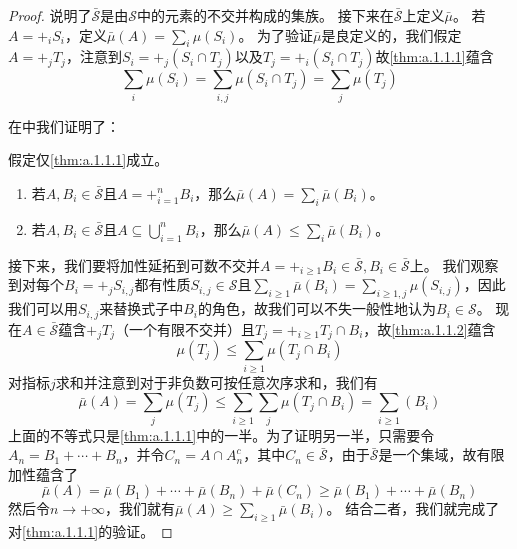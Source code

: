 \documentclass[main.tex]{subfiles}
\begin{document}
\begin{proof}
	说明了\(\bar{\mathcal{S}}\)是由\(\mathcal{S}\)中的元素的不交并构成的集族。
	接下来在\(\bar{\mathcal{S}}\)上定义\(\bar{\mu}\)。
	若\(A = +_i S_i\)，定义\(\bar{\mu}(A) = \sum_i\mu(S_i)\)。
	为了验证\(\bar{\mu}\)是良定义的，我们假定\(A = +_jT_j\)，注意到\(S_i = +_j(S_i \cap T_j)\)以及\(T_j = +_i(S_i\cap T_j)\)故\ref{thm:a.1.1.1}蕴含
	\[\sum_i \mu(S_i) = \sum_{i,j}\mu(S_i\cap T_j) = \sum_j \mu(T_j)\]

	在中我们证明了：
	\begin{lemma} \label{a.1.2}
		假定仅\ref{thm:a.1.1.1}成立。
		\begin{enumerate} [label=(\alph*)]
			\item 若\(A, B_i \in \bar{\mathcal{S}}\)且\(A = +_{i=1}^n B_i\)，那么\(\bar{\mu}(A) = \sum_i\bar{\mu}(B_i)\)。
			\item 若\(A, B_i \in \bar{\mathcal{S}}\)且\(A \subseteq \bigcup_{i=1}^n B_i\)，那么\(\bar{\mu}(A) \leq \sum_i\bar{\mu}(B_i)\)。
		\end{enumerate}
	\end{lemma}
	接下来，我们要将加性延拓到可数不交并\(A = +_{i\geq 1}B_i \in \bar{\mathcal{S}}, B_i \in \bar{\mathcal{S}}\)上。
	我们观察到对每个\(B_i = +_j S_{i,j}\)都有性质\(S_{i,j} \in \mathcal{S}\)且\(\sum_{i\geq 1}\bar{\mu}(B_i) = \sum_{i\geq 1,j}\mu(S_{i,j})\)，因此我们可以用\(S_{i,j}\)来替换式子中\(B_i\)的角色，故我们可以不失一般性地认为\(B_i \in \mathcal{S}\)。
	现在\(A \in \bar{\mathcal{S}}\)蕴含\(+_jT_j\)（一个有限不交并）且\(T_j = +_{i\geq 1} T_j\cap B_i\)，故\ref{thm:a.1.1.2}蕴含
	\[\mu(T_j) \leq \sum_{i \geq 1}\mu(T_j \cap B_i)\]
	对指标\(j\)求和并注意到对于非负数可按任意次序求和，我们有
	\[\bar{\mu}(A) = \sum_j\mu(T_j) \leq \sum_{i\geq 1}\sum_j \mu(T_j\cap B_i) = \sum_{i \geq 1}(B_i)\]
	上面的不等式只是\ref{thm:a.1.1.1}中的一半。为了证明另一半，只需要令\(A_n = B_1+\cdots+B_n\)，并令\(C_n = A\cap A_n^c\)，其中\(C_n \in \bar{\mathcal{S}}\)，由于\(\bar{\mathcal{S}}\)是一个集域，故有限加性蕴含了
	\[\bar{\mu}(A) = \bar{\mu}(B_1) + \cdots +\bar{\mu}(B_n) + \bar{\mu}(C_n) \geq \bar{\mu}(B_1) + \cdots + \bar{\mu}(B_n)\]
	然后令\(n \rightarrow +\infty\)，我们就有\(\bar{\mu}(A) \geq \sum_{i\geq 1}\bar{\mu}(B_i)\)。
	结合二者，我们就完成了对\ref{thm:a.1.1.1}的验证。


\end{proof}
\end{document}
